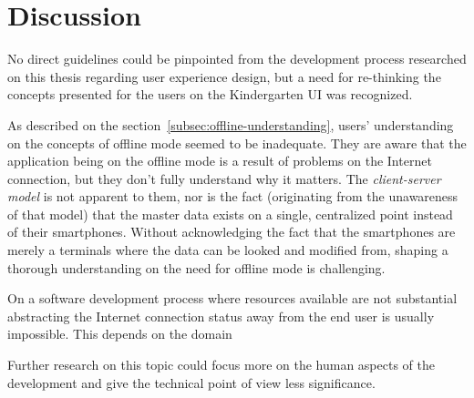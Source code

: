 \section{Discussion}



No direct guidelines could be pinpointed from the development process researched on this thesis regarding user experience design, but a need for re-thinking the concepts presented for the users on the Kindergarten UI was recognized.

As described on the section~\ref{subsec:offline-understanding}, users' understanding on the concepts of offline mode seemed to be inadequate. They are aware that the application being on the offline mode is a result of  problems on the Internet connection, but they don't fully understand why it matters. The \textit{client-server model} is not apparent to them, nor is the fact (originating from the unawareness of that model) that the master data exists on a single, centralized point instead of their smartphones. Without acknowledging the fact that the smartphones are merely a terminals where the data can be looked and modified from, shaping a thorough understanding on the need for offline mode is challenging.

On a software development process where resources available are not substantial abstracting the Internet connection status away from the end user is usually impossible. This depends on the domain



Further research on this topic could focus more on the human aspects of the development and give the technical point of view less significance.


















